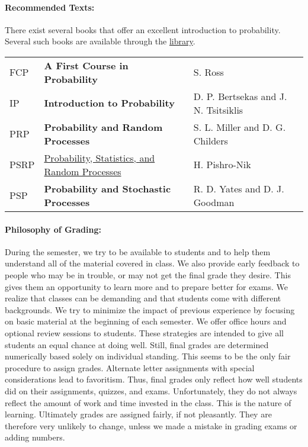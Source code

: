 \documentclass{article}
\begin{document}
\paragraph{Recommended Texts:}
There exist several books that offer an excellent introduction to probability.
Several such books are available through the \href{http://library.tamu.edu}{library}.
\begin{center}
\begin{tabular}{lll}
FCP & \textbf{A First Course in Probability} & S. Ross \tabularnewline[1mm]
IP & \textbf{Introduction to Probability} & D. P. Bertsekas and J. N. Tsitsiklis \tabularnewline[1mm]
PRP & \textbf{Probability and Random Processes} & S. L. Miller and D. G. Childers \tabularnewline[1mm]
PSRP & \href{http://www.probabilitycourse.com/}{Probability, Statistics, and Random Processes} & H. Pishro-Nik\tabularnewline[1mm]
PSP & \textbf{Probability and Stochastic Processes%
} & R. D. Yates and D. J. Goodman
\end{tabular}
\end{center}


\paragraph{Philosophy of Grading:}
During the semester, we try to be available to students and to help them understand all of the material covered in class.
We also provide early feedback to people who may be in trouble, or may not get the final grade they desire.
This gives them an opportunity to learn more and to prepare better for exams.
We realize that classes can be demanding and that students come with different backgrounds.
We try to minimize the impact of previous experience by focusing on basic material at the beginning of each semester.
We offer office hours and optional review sessions to students.
These strategies are intended to give all students an equal chance at doing well.
Still, final grades are determined numerically based solely on individual standing.
This seems to be the only fair procedure to assign grades.
Alternate letter assignments with special considerations lead to favoritism.
Thus, final grades only reflect how well students did on their assignments, quizzes, and exams.
Unfortunately, they do not always reflect the amount of work and time invested in the class.
This is the nature of learning.
Ultimately grades are assigned fairly, if not pleasantly.
They are therefore very unlikely to change, unless we made a mistake in grading exams or adding numbers.
\end{document}
